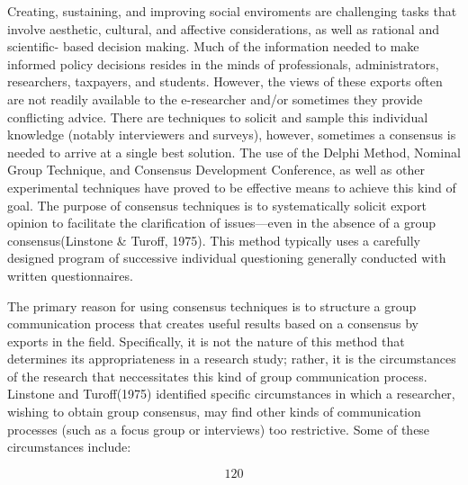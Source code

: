 \noindent 

\noindent Creating, sustaining, and improving social enviroments are challenging tasks that involve aesthetic, cultural, and affective considerations, as well as rational and scientific- based decision making. Much of the information needed to make informed policy decisions resides in the minds of professionals, administrators, researchers, taxpayers, and students. However, the views of these exports often are not readily available to the e-researcher and/or sometimes they provide conflicting advice. There are techniques to solicit and sample this individual knowledge (notably interviewers and surveys), however, sometimes a consensus is needed to arrive at a single best solution. The use of the Delphi Method, Nominal Group Technique, and Consensus Development Conference, as well as other experimental techniques have proved to be effective means to achieve this kind of goal. The purpose of consensus techniques is to systematically solicit export opinion to facilitate the clarification of issues---even in the absence of a group consensus(Linstone \& Turoff, 1975). This method  typically uses a carefully designed program of successive individual questioning generally conducted with written questionnaires.

\noindent       The primary reason for using consensus techniques is to structure a group communication process that creates useful results based on a consensus by exports in the field. Specifically, it is not the nature of this method that determines its appropriateness in a research study; rather, it is the circumstances of the research that neccessitates this kind of group communication process. Linstone and Turoff(1975) identified specific circumstances in which a researcher,  wishing to obtain group consensus, may find other kinds of communication processes (such as a focus group or interviews) too restrictive. Some of these circumstances include:

\noindent 

\noindent 
\[120\] 


